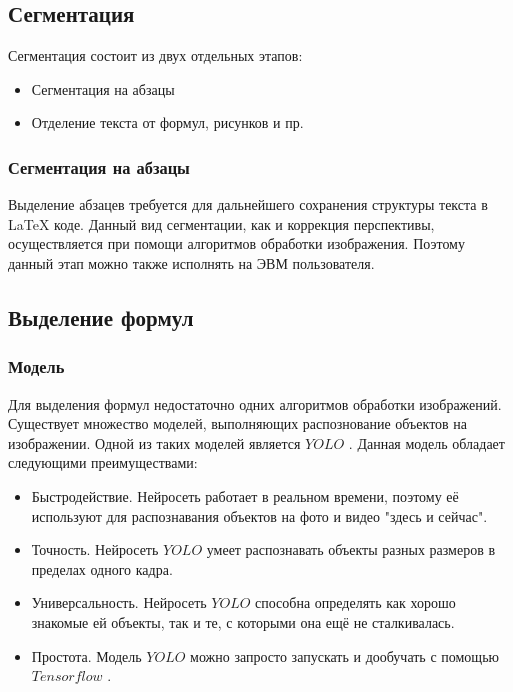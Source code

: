 \subsection{Сегментация}

Сегментация состоит из двух отдельных этапов:
\begin{itemize}
    \item Сегментация на абзацы
    \item Отделение текста от формул, рисунков и пр.
\end{itemize}

\subsubsection{Сегментация на абзацы}

Выделение абзацев требуется для дальнейшего сохранения структуры текста в \LaTeX\; коде. Данный вид сегментации, как и коррекция перспективы, осуществляется при помощи алгоритмов обработки изображения.
Поэтому данный этап можно также исполнять на ЭВМ пользователя.



\subsection{Выделение формул}
\subsubsection{Модель}

Для выделения формул недостаточно одних алгоритмов обработки изображений. Существует множество моделей, выполняющих распознование объектов на изображении.
Одной из таких моделей является $YOLO$ \cite{yolo}. Данная модель обладает следующими преимуществами:
\begin{itemize}
    \item Быстродействие. Нейросеть работает в реальном времени, поэтому её используют для распознавания объектов на фото и видео "здесь и сейчас".
    \item Точность. Нейросеть $YOLO$ умеет распознавать объекты разных размеров в пределах одного кадра.
    \item Универсальность. Нейросеть $YOLO$ способна определять как хорошо знакомые ей объекты, так и те, с которыми она ещё не сталкивалась.
    \item Простота. Модель $YOLO$ можно запросто запускать и дообучать с помощью $Tensorflow$ \cite{tensorflow}.
\end{itemize}

